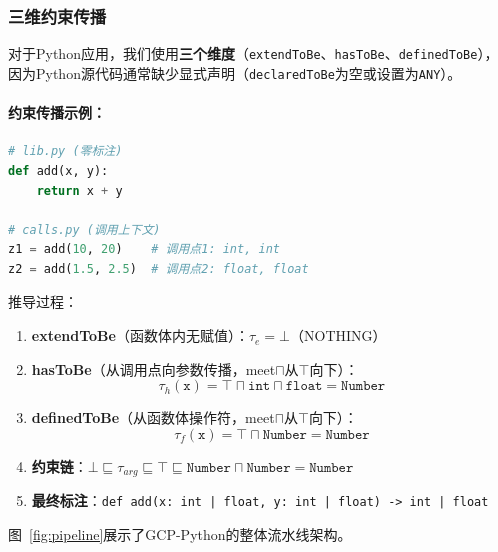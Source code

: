 \documentclass[UTF8]{article}
\begin{document}
\subsubsection{三维约束传播}

对于Python应用，我们使用\textbf{三个维度}（\texttt{extendToBe}、\texttt{hasToBe}、\texttt{definedToBe}），因为Python源代码通常缺少显式声明（\texttt{declaredToBe}为空或设置为\texttt{ANY}）。

\paragraph{约束传播示例：}

\begin{lstlisting}[language=Python]
# lib.py (零标注)
def add(x, y):
    return x + y

# calls.py (调用上下文)
z1 = add(10, 20)    # 调用点1: int, int
z2 = add(1.5, 2.5)  # 调用点2: float, float
\end{lstlisting}

推导过程：
\begin{enumerate}[leftmargin=2em]
\item \textbf{extendToBe}（函数体内无赋值）：$\tau_e = \bot$（NOTHING）
\item \textbf{hasToBe}（从调用点向参数传播，meet$\sqcap$从$\top$向下）：
  \[\tau_h(\texttt{x}) = \top \sqcap \texttt{int} \sqcap \texttt{float} = \texttt{Number}\]
\item \textbf{definedToBe}（从函数体操作符，meet$\sqcap$从$\top$向下）：
  \[\tau_f(\texttt{x}) = \top \sqcap \texttt{Number} = \texttt{Number}\]
\item \textbf{约束链}：$\bot \sqsubseteq \tau_{\mathit{arg}} \sqsubseteq \top \sqsubseteq \texttt{Number} \sqcap \texttt{Number} = \texttt{Number}$
\item \textbf{最终标注}：\texttt{def add(x: int | float, y: int | float) -> int | float}
\end{enumerate}

图~\ref{fig:pipeline}展示了GCP-Python的整体流水线架构。
\end{document}
